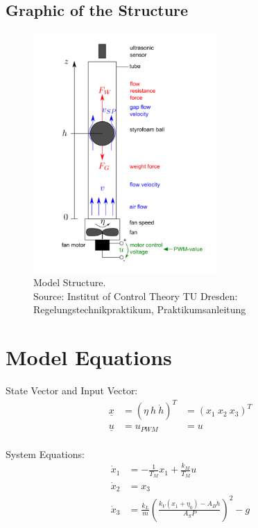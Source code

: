 \documentclass[10pt,a4paper]{article}
\begin{document}
	\subsection{Graphic of the Structure}	
	\begin{figure}[H]
		\centering
		\captionsetup{justification=centering, margin=1cm}
		\includegraphics[width=70mm]{ball_in_tube.pdf}
		\caption{Model Structure. \\ \footnotesize{Source: Institut of Control Theory TU Dresden: Regelungstechnikpraktikum, Praktikumsanleitung}}
	\end{figure}
	
	
	\section{Model Equations} %
	
	State Vector and Input Vector:
	\begin{align*}
	    \underline{x} &= (\eta \ h \ \dot{h})^T &= (x_1 \ x_2 \ x_3)^T \\
		\underline{u} &= u_{PWM} &= u \\
	\end{align*}
	
	\noindent System Equations:			
	\begin{subequations}
	\begin{align}
		\dot{x}_1 &= -\frac{1}{T_M}x_1 + \frac{k_M}{T_M}u\\
		\dot{x}_2 &= x_3 \\
		\dot{x}_3 &= \frac{k_L}{m}\left(\frac{k_V(x_1+\eta_0) - A_B\dot{h}}{A_SP}\right)^2 -g
	\end{align}
	\end{subequations}
\end{document}
